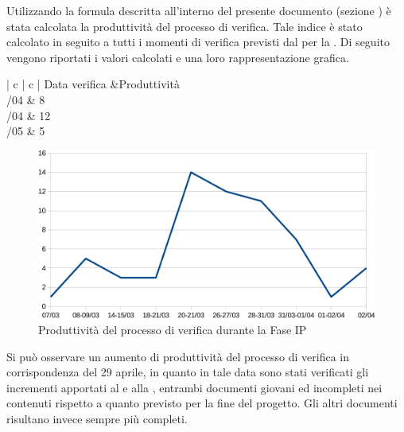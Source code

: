 	Utilizzando la formula descritta all'interno del presente documento (sezione ) è stata calcolata la produttività del processo di verifica. Tale indice è stato calcolato in seguito a tutti i momenti di verifica previsti dal  per la . Di seguito vengono riportati i valori calcolati e una loro rappresentazione grafica.
	\begin{table}[H]
		\centering
		\begin{tabu}{| c | c |}
			\hline
			Data verifica &Produttività\\ \hline {}/04 & 8 \\ /04 & 12\\ /05 & 5 \\ \hline					
		\end{tabu}
		\caption{Produttività del processo di verifica durante la fase IP}
	\end{table}
	\begin{figure}[H]
		\centering
		\includegraphics[width=12cm]{PianoDiQualifica/Pics/ProduttivitaVerificaFaseSD.pdf}
		\caption{Produttività del processo di verifica durante la Fase IP}
	\end{figure}

	Si può osservare un aumento di produttività del processo di verifica in corrispondenza del 29 aprile, in quanto in tale data sono stati verificati gli incrementi apportati al  e alla , entrambi documenti giovani ed incompleti nei contenuti rispetto a quanto previsto per la fine del progetto. Gli altri documenti risultano invece sempre più completi.

